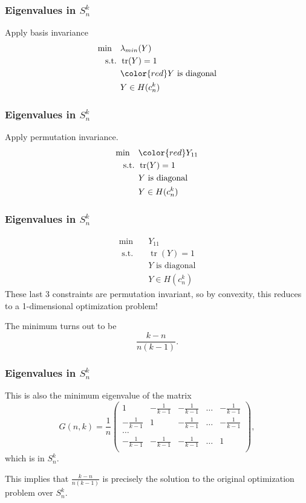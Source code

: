 \documentclass{beamer}
\DeclareMathOperator{\tr}{tr}
\newcommand{\st}{{\text{ s.t. }}}
\begin{document}
\begin{frame}
    \frametitle{Eigenvalues in $S^k_n$}
    Apply basis invariance
    \begin{equation*}
        \begin{aligned}
            \min\quad & \lambda_{min}(Y)\\
            \st & \tr(Y) = 1\\
                & {\color{red}Y \text{ is diagonal}}\\
                & Y \in H(c_n^k)
        \end{aligned}
    \end{equation*}
\end{frame}
\begin{frame}
    \frametitle{Eigenvalues in $S^k_n$}
    Apply permutation invariance.
    \begin{equation*}
        \begin{aligned}
            \min\quad & {\color{red}Y_{11}}\\
            \st & \tr(Y) = 1\\
                & Y \text{ is diagonal}\\
                & Y \in H(c_n^k)
        \end{aligned}
    \end{equation*}
\end{frame}
\begin{frame}
    \frametitle{Eigenvalues in $S^k_n$}
    \begin{equation*}
        \begin{aligned}
            \min\quad & Y_{11}\\
            \st & \tr(Y) = 1\\
                & Y \text{ is diagonal}\\
                & Y \in H(c_n^k)
        \end{aligned}
    \end{equation*}
    \pause
    These last 3 constraints are permutation invariant, so by convexity, this reduces to a 1-dimensional optimization problem!

    The minimum turns out to be 
    \[
        \frac{k-n}{n(k-1)}.
    \]

\end{frame}
\begin{frame}
    \frametitle{Eigenvalues in $S^k_n$}
    This is also the minimum eigenvalue of the matrix
    \[
        G(n,k) = 
        \frac{1}{n}
        \begin{pmatrix}
            1 & -\frac{1}{k-1} & -\frac{1}{k-1}  &\dots& -\frac{1}{k-1}\\
            -\frac{1}{k-1} & 1 & -\frac{1}{k-1}  &\dots& -\frac{1}{k-1}\\
            \dots\\
            -\frac{1}{k-1} & -\frac{1}{k-1}& -\frac{1}{k-1}  &\dots & 1\\
        \end{pmatrix},
    \]
    which is in $S^k_n$.

    This implies that $\frac{k-n}{n(k-1)}$ is precisely the solution to the original optimization problem over $S^k_n$.
\end{frame}
\end{document}

